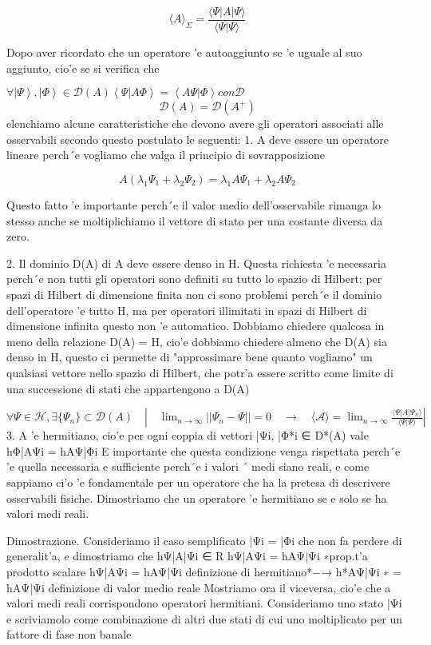$$\langle A\rangle_{\Sigma}=\frac{\langle\Psi|A|\Psi\rangle}{\langle\Psi|\Psi\rangle}$$

Dopo aver ricordato che un operatore 'e autoaggiunto se 'e uguale al suo aggiunto, cio'e se si verifica che

$\forall\left|\Psi\right\rangle,\left|\Phi\right\rangle\in\mathcal{D}(A)$$\left\langle\Psi|A\Phi\right\rangle=\left\langle A\Psi|\Phi\right\rangle$$con$$\mathcal{D}$
$${\mathcal{D}}(A)={\mathcal{D}}(A^{+})$$
elenchiamo alcune caratteristiche che devono avere gli operatori associati alle osservabili secondo questo postulato le seguenti:
1. A deve essere un operatore lineare perch´e vogliamo che valga il principio di sovrapposizione

$$A(\lambda_{1}\Psi_{1}+\lambda_{2}\Psi_{2})=\lambda_{1}A\Psi_{1}+\lambda_{2}A\Psi_{2}$$

Questo fatto 'e importante perch´e il valor medio dell'osservabile rimanga lo stesso anche se moltiplichiamo il vettore di stato per una costante diversa da zero.

2. Il dominio D(A) di A deve essere denso in H. Questa richiesta 'e necessaria perch´e non tutti gli operatori sono definiti su tutto lo spazio di Hilbert: per spazi di Hilbert di dimensione finita non ci sono problemi perch´e il dominio dell'operatore 'e tutto H, ma per operatori illimitati in spazi di Hilbert di dimensione infinita questo non 'e automatico. Dobbiamo chiedere qualcosa in meno della relazione D(A) = H, cio'e dobbiamo chiedere almeno che D(A) sia denso in H, questo ci permette di "approssimare bene quanto vogliamo" un qualsiasi vettore nello spazio di Hilbert, che potr'a essere scritto come limite di una successione di stati che appartengono a D(A)

$\forall\Psi\in\mathcal{H},\exists\{\Psi_{n}\}\subset\mathcal{D}(A)\quad\left|\quad\lim_{n\to\infty}||\Psi_{n}-\Psi||=0\quad\longrightarrow\quad\langle\mathcal{A}\rangle=\lim_{n\to\infty}\frac{\langle\Psi|A|\Psi_{n}\rangle}{\langle\Psi|\Psi\rangle}\right|$
3. A 'e hermitiano, cio'e per ogni coppia di vettori |Ψi, |Φ*i ∈ D*(A) vale hΦ|AΨi = hAΨ|Φi E importante che questa condizione venga rispettata perch´e 'e quella necessaria e sufficiente perch´e i valori ´
medi siano reali, e come sappiamo ci'o 'e fondamentale per un operatore che ha la pretesa di descrivere osservabili fisiche. Dimostriamo che un operatore 'e hermitiano se e solo se ha valori medi reali.

Dimostrazione. Consideriamo il caso semplificato |Ψi = |Φi che non fa perdere di generalit'a, e dimostriamo che hΨ|A|Ψi ∈ R
hΨ|AΨi = hAΨ|Ψi
∗prop.t'a prodotto scalare hΨ|AΨi = hAΨ|Ψi definizione di hermitiano*−→ h*AΨ|Ψi
∗ = hAΨ|Ψi definizione di valor medio reale Mostriamo ora il viceversa, cio'e che a valori medi reali corrispondono operatori hermitiani. Consideriamo uno stato |Ψi e scriviamolo come combinazione di altri due stati di cui uno moltiplicato per un fattore di fase non banale


